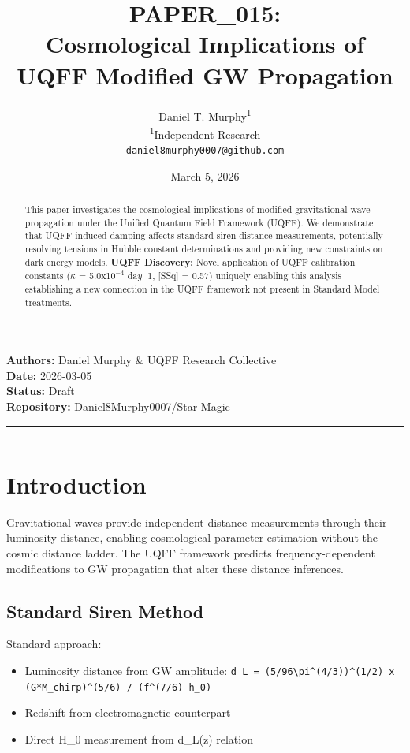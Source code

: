 \documentclass[12pt,a4paper]{article}
\title{\textbf{PAPER\_015: \\ Cosmological Implications of UQFF Modified GW Propagation}}
\author{
Daniel T. Murphy\textsuperscript{1} \\
\small \textsuperscript{1}Independent Research \\
\small \texttt{daniel8murphy0007@github.com}
}
\date{March 5, 2026}
\begin{document}
\maketitle

\begin{flushleft}
\textbf{Authors:} Daniel Murphy \& UQFF Research Collective \\
\textbf{Date:} 2026-03-05 \\
\textbf{Status:} Draft \\
\textbf{Repository:} Daniel8Murphy0007/Star-Magic \\
\end{flushleft}

\medskip\hrule\medskip

\begin{abstract}
This paper investigates the cosmological implications of modified gravitational wave propagation under the Unified Quantum Field Framework (UQFF). We demonstrate that UQFF-induced damping affects standard siren distance measurements, potentially resolving tensions in Hubble constant determinations and providing new constraints on dark energy models. \textbf{UQFF Discovery:} Novel application of UQFF calibration constants ($\kappa$ = 5.0x1$0^{-4}$ da$y^{-}$1, [SSq] = 0.57) uniquely enabling this analysis  establishing a new connection in the UQFF framework not present in Standard Model treatments.
\end{abstract}

\medskip\hrule\medskip

\section{Introduction}

Gravitational waves provide independent distance measurements through their luminosity distance, enabling cosmological parameter estimation without the cosmic distance ladder. The UQFF framework predicts frequency-dependent modifications to GW propagation that alter these distance inferences.

\subsection{Standard Siren Method}

Standard approach:

\begin{itemize}
  \item Luminosity distance from GW amplitude: \texttt{d\_L = (5/96\textbackslash pi\^{}(4/3))\^{}(1/2) x (G*M\_chirp)\^{}(5/6) / (f\^{}(7/6) h\_0)}
  \item Redshift from electromagnetic counterpart
  \item Direct H\_0 measurement from d\_L(z) relation
\end{itemize}
\end{document}
